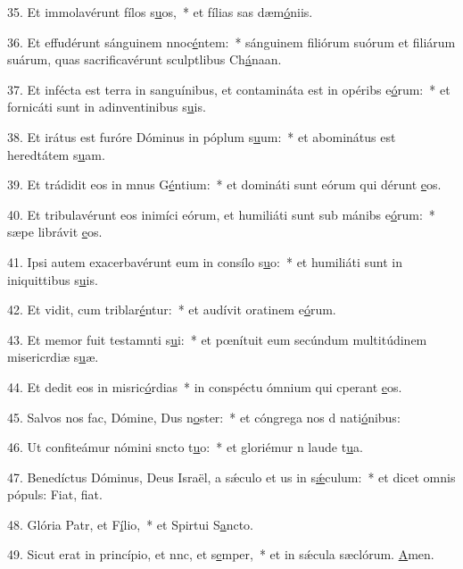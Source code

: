 35. Et immolavérunt fílos s\uline{u}os,~* et fílias sas dæm\uline{ó}niis.\par 
36. Et effudérunt sánguinem nnoc\uline{é}ntem:~* sánguinem filiórum suórum et filiárum suárum, quas sacrificavérunt sculptlibus Ch\uline{á}naan.\par 
37. Et infécta est terra in sanguínibus, et contamináta est in opéribs e\uline{ó}rum:~* et fornicáti sunt in adinventinibus s\uline{u}is.\par 
38. Et irátus est furóre Dóminus in póplum s\uline{u}um:~* et abominátus est heredtátem s\uline{u}am.\par 
39. Et trádidit eos in mnus G\uline{é}ntium:~* et domináti sunt eórum qui dérunt \uline{e}os.\par 
40. Et tribulavérunt eos inimíci eórum, et humiliáti sunt sub mánibs e\uline{ó}rum:~* sæpe librávit \uline{e}os.\par 
41. Ipsi autem exacerbavérunt eum in consílo s\uline{u}o:~* et humiliáti sunt in iniquittibus s\uline{u}is.\par 
42. Et vidit, cum triblar\uline{é}ntur:~* et audívit oratinem e\uline{ó}rum.\par 
43. Et memor fuit testamnti s\uline{u}i:~* et pœnítuit eum secúndum multitúdinem misericrdiæ s\uline{u}æ.\par 
44. Et dedit eos in misric\uline{ó}rdias~* in conspéctu ómnium qui cperant \uline{e}os.\par 
45. Salvos nos fac, Dómine, Dus n\uline{o}ster:~* et cóngrega nos d nati\uline{ó}nibus:\par 
46. Ut confiteámur nómini sncto t\uline{u}o:~* et gloriémur n laude t\uline{u}a.\par 
47. Benedíctus Dóminus, Deus Israël, a sǽculo et us in s\uline{ǽ}culum:~* et dicet omnis pópuls: Fiat, f\uline{i}at.\par 
48. Glória Patr, et F\uline{í}lio,~* et Spirtui S\uline{a}ncto.\par 
49. Sicut erat in princípio, et nnc, et s\uline{e}mper,~* et in sǽcula sæclórum. \uline{A}men.\par 
